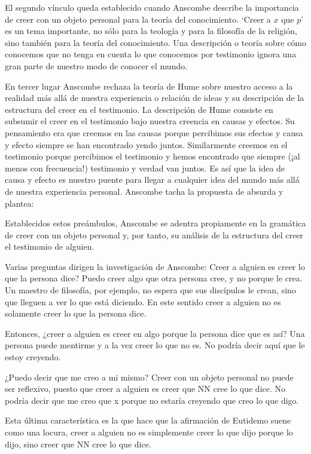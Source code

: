 El segundo vínculo queda establecido cuando Anscombe describe la importancia de
creer con un objeto personal para la teoría del conocimiento. `Creer a $x$ que
$p$' es un tema importante, no sólo para la teología y para la filosofía de la
religión, sino también para la teoría del conocimiento. Una descripción o teoría
sobre cómo conocemos que no tenga en cuenta lo que conocemos por testimonio
ignora una gran parte de nuestro modo de conocer el mundo. 

En tercer lugar Anscombe rechaza la teoría de Hume sobre nuestro acceso a la
realidad más allá de nuestra experiencia o relación de ideas y su descripción de
la estructura del creer en el testimonio. La descripción de Hume consiste en
subsumir el creer en el testimonio bajo nuestra creencia en causas y efectos. Su
pensamiento era que creemos en las causas porque percibimos sus efectos y causa
y efecto siempre se han encontrado yendo juntos. Similarmente creemos en el
testimonio porque percibimos el testimonio y hemos encontrado que siempre (¡al
menos con frecuencia!) testimonio y verdad van juntos. Es así que la idea de
causa y efecto es nuestro puente para llegar a cualquier idea del mundo más allá
de nuestra experiencia personal. Anscombe tacha la propuesta de absurda y
plantea: 

Establecidos estos preámbulos, Anscombe se adentra propiamente en la gramática
de creer con un objeto personal y, por tanto, su análisis de la estructura del
creer el testimonio de alguien.

Varias preguntas dirigen la investigación de Anscombe:
Creer a alguien es creer lo que la persona dice?
Puedo creer algo que otra persona cree, y no porque le crea. Un maestro de
filosofía, por ejemplo, no espera que sus discípulos le crean, sino que lleguen
a ver lo que está diciendo. En este sentido creer a alguien no es solamente
creer lo que la persona dice.

Entonces, ¿creer a alguien es creer en algo porque la persona dice que es así?
Una persona puede mentirme y a la vez creer lo que no es. No podría decir aquí
que le estoy creyendo.

¿Puedo decir que me creo a mi mismo? Creer con un objeto personal no puede ser
reflexivo, puesto que creer a alguien es creer que NN cree lo que dice. No
podría decir que me creo que x porque no estaría creyendo que creo lo que digo.

Esta última característica es la que hace que la afirmación de Eutidemo suene
como una locura, creer a alguien no es simplemente creer lo que dijo porque lo
dijo, sino creer que NN cree lo que dice.

